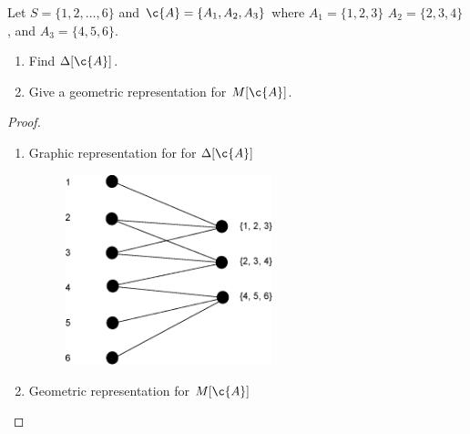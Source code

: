 \prob
{
    Let $S = \{1, 2, \dots, 6\}$ and $\c{A} = \{A_1, A_2, A_3\}$ where $A_1 = \{1, 2, 3\}$
    $A_2 = \{2, 3, 4\}$, and $A_3 = \{4, 5, 6\}$.
    \begin{enumerate}[label=(\roman*)]
        \item   Find $\Delta[\c{A}]$.
        \item   Give a geometric representation for $M[\c{A}]$.
    \end{enumerate}
}
\begin{proof}$\,$\pn
    \begin{enumerate}
        \item   Graphic representation for for $\Delta[\c{A}]$

                \begin{figure}[H]%
                    \centering
                    \caption{}%
                    \includegraphics[width=6cm]{Test1/Problem11/deltaA.eps}
                \end{figure}
        
        \item   Geometric representation for $M[\c{A}]$
    \end{enumerate}

\end{proof}